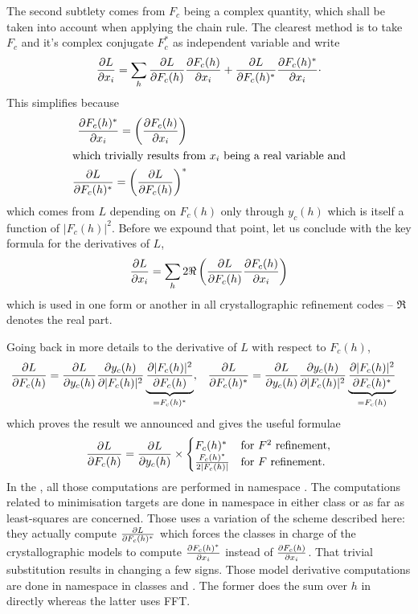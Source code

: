 \documentclass[11pt]{article}
\begin{document}
The second subtlety comes from $F_c$ being a complex quantity, which shall be taken into account when applying the chain rule. The clearest method is to take $F_c$ and it's complex conjugate $F_c^*$ as independent variable and write
\begin{equation}
\frac{\partial L}{\partial x_i} = \sum_h \frac{\partial L}{\partial F_c(h)} \frac{\partial F_c(h)}{\partial x_i} + \frac{\partial L}{\partial F_c(h)^*}\frac{\partial F_c(h)^*}{\partial x_i} \cdot \nonumber
\end{equation}
This simplifies because
\begin{align}
\frac{\partial F_c(h)^*}{\partial x_i} = \left( \frac{\partial F_c(h)}{\partial x_i} \right)\\
\intertext{which trivially results from $x_i$ being a real variable and}
\frac{\partial L}{\partial F_c(h)^*} = \left( \frac{\partial L}{\partial F_c(h)} \right)^*
\end{align}
which comes from $L$ depending on $F_c(h)$ only through $y_c(h)$ which is itself a function of $|F_c(h)|^2$. Before we expound that point, let us conclude with the key formula for the derivatives of $L$,
\begin{equation}
\frac{\partial L}{\partial x_i} = \sum_h 2 \Re \left( \frac{\partial L}{\partial F_c(h)} \frac{\partial F_c(h)}{\partial x_i} \right)
\label{eqn:der:L:wrt:xi}
\end{equation}
which is used in one form or another in all crystallographic refinement codes -- $\Re$ denotes the real part.

Going back in more details to the derivative of $L$ with respect to $F_c(h)$,
\begin{align}
\frac{\partial L}{\partial F_c(h)} &=
\frac{\partial L}{\partial y_c(h)}
\frac{\partial y_c(h)}{\partial |F_c(h)|^2}
\underbrace{ \frac{\partial |F_c(h)|^2}{\partial F_c(h)} }_{=F_c(h)^*},
&
\frac{\partial L}{\partial F_c(h)^*} &=
\frac{\partial L}{\partial y_c(h)}
\frac{\partial y_c(h)}{\partial |F_c(h)|^2}
\underbrace{ \frac{\partial |F_c(h)|^2}{\partial F_c(h)^*} }_{=F_c(h)}
\nonumber
\end{align}
which proves the result we announced and gives the useful formulae
\begin{equation}
\frac{\partial L}{\partial F_c(h)} = \frac{\partial L}{\partial y_c(h)} \times
\begin{cases}
F_c(h)^* & \text{for $F^2$ refinement},\\
\frac{F_c(h)^*}{2|F_c(h)|} & \text{for $F$ refinement.}
\end{cases}
\end{equation}
In the , all those computations are performed in namespace . The computations related to minimisation targets are done in namespace  in either class  or  as far as least-squares are concerned. Those uses a variation of the scheme described here: they actually compute $\frac{\partial L}{\partial F_c(h)^*}$ which forces the classes in charge of the crystallographic models to compute $\frac{\partial F_c(h)^*}{\partial x_i}$ instead of $\frac{\partial F_c(h)}{\partial x_i}$. That trivial substitution results in changing a few signs. Those model derivative computations are done in namespace  in classes  and . The former does the sum over $h$ in  directly whereas the latter uses FFT.
\end{document}
